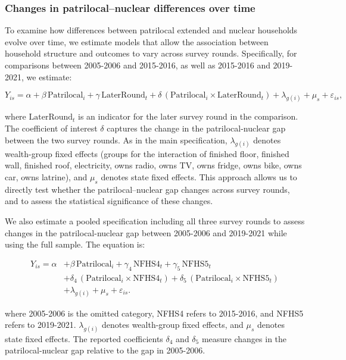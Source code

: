 \documentclass[12pt]{article}
\begin{document}
\subsubsection{Changes in patrilocal–nuclear differences over time}

To examine how differences between patrilocal extended and nuclear households evolve over time, we estimate models that allow the association between household structure and outcomes to vary across survey rounds. Specifically, for comparisons between 2005-2006 and 2015-2016, as well as 2015-2016 and 2019-2021, we estimate:

\begin{equation} \label{eq:tworounds}
Y_{is} = \alpha + \beta \,\text{Patrilocal}_i + \gamma \,\text{LaterRound}_t
+ \delta \,(\text{Patrilocal}_i \times \text{LaterRound}_t)
+ \lambda_{g(i)} + \mu_s + \varepsilon_{is},
\end{equation}


where $\text{LaterRound}_t$ is an indicator for the later survey round in the comparison. The coefficient of interest $\delta$ captures the change in the patrilocal-nuclear gap between the two survey rounds. As in the main specification, $\lambda_{g(i)}$ denotes wealth-group fixed effects (groups for the interaction of finished floor, finished wall, finished roof, electricity, owns radio, owns TV, owns fridge, owns bike, owns car, owns latrine), and $\mu_s$ denotes state fixed effects. This approach allows us to directly test whether the patrilocal–nuclear gap changes across survey rounds, and to assess the statistical significance of these changes.

We also estimate a pooled specification including all three survey rounds to assess changes in the patrilocal-nuclear gap between 2005-2006 and 2019-2021 while using the full sample. The equation is:

\begin{equation} \label{eq:stacked}
\begin{aligned}
Y_{is} = \alpha 
&+ \beta \,\text{Patrilocal}_i
+ \gamma_4 \,\text{NFHS4}_t
+ \gamma_5 \,\text{NFHS5}_t \\
&+ \delta_4 \,(\text{Patrilocal}_i \times \text{NFHS4}_t)
+ \delta_5 \,(\text{Patrilocal}_i \times \text{NFHS5}_t) \\
&+ \lambda_{g(i)} + \mu_s + \varepsilon_{is}.
\end{aligned}
\end{equation}

where 2005-2006 is the omitted category, NFHS4 refers to 2015-2016, and NFHS5 refers to 2019-2021. $\lambda_{g(i)}$ denotes wealth-group fixed effects, and $\mu_s$ denotes state fixed effects. The reported coefficients $\delta_4$ and $\delta_5$ measure changes in the patrilocal-nuclear gap relative to the gap in 2005-2006.
\end{document}
